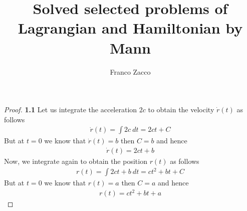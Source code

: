 \documentclass[11pt]{article}
\title{\textbf{Solved selected problems of Lagrangian and Hamiltonian by Mann}}
\author{Franco Zacco}
\date{}
\theoremstyle{definition}
\begin{document}
\maketitle
\thispagestyle{empty}

\begin{proof}{\textbf{1.1}}
Let us integrate the acceleration $2c$ to obtain the velocity $\dot{r}(t)$
as follows
\begin{align*}
    \dot{r}(t) = \int 2c~dt = 2ct + C
\end{align*}
But at $t = 0$ we know that $\dot{r}(t) = b$ then $C = b$ and hence
\begin{align*}
    \dot{r}(t) = 2ct + b
\end{align*}
Now, we integrate again to obtain the position $r(t)$ as follows
\begin{align*}
    r(t) = \int 2ct + b~dt = ct^2 + bt + C
\end{align*}
But at $t = 0$ we know that $r(t) = a$ then $C = a$ and hence
\begin{align*}
    r(t) = ct^2 + bt + a
\end{align*}


\end{proof}
\end{document}
